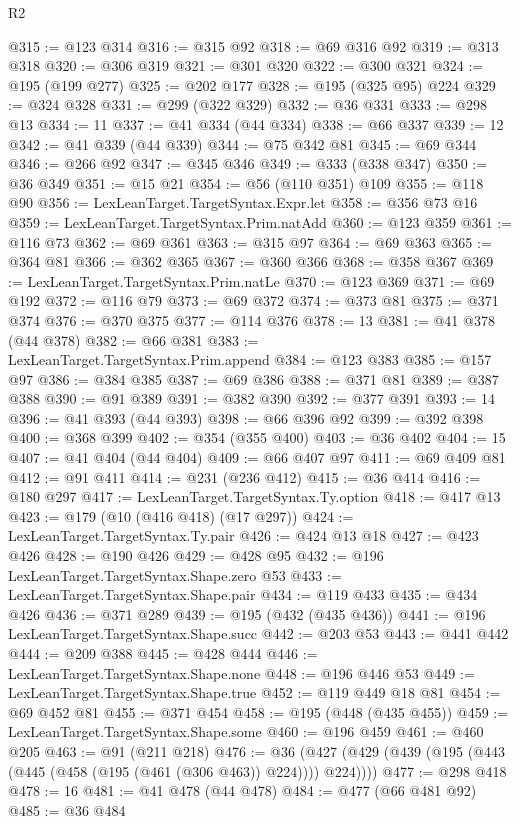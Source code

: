 \begin{lexlean}{R2}
\begin{coremodule}
{{{{{{{{{{{{{{{{{{{{{{{{{{{{{{{{{{{{{{{{{{{{{{@315 := @123 @314
@316 := @315 @92
@318 := @69 @316 @92
@319 := @313 @318
@320 := @306 @319
@321 := @301 @320
@322 := @300 @321
@324 := @195 (@199 @277)
@325 := @202 @177
@328 := @195 (@325 @95) @224
@329 := @324 @328
@331 := @299 (@322 @329)
@332 := @36 @331
@333 := @298 @13
@334 := 11
@337 := @41 @334 (@44 @334)
@338 := @66 @337
@339 := 12
@342 := @41 @339 (@44 @339)
@344 := @75 @342 @81
@345 := @69 @344
@346 := @266 @92
@347 := @345 @346
@349 := @333 (@338 @347)
@350 := @36 @349
@351 := @15 @21
@354 := @56 (@110 @351) @109
@355 := @118 @90
@356 := LexLeanTarget.TargetSyntax.Expr.let
@358 := @356 @73 @16
@359 := LexLeanTarget.TargetSyntax.Prim.natAdd
@360 := @123 @359
@361 := @116 @73
@362 := @69 @361
@363 := @315 @97
@364 := @69 @363
@365 := @364 @81
@366 := @362 @365
@367 := @360 @366
@368 := @358 @367
@369 := LexLeanTarget.TargetSyntax.Prim.natLe
@370 := @123 @369
@371 := @69 @192
@372 := @116 @79
@373 := @69 @372
@374 := @373 @81
@375 := @371 @374
@376 := @370 @375
@377 := @114 @376
@378 := 13
@381 := @41 @378 (@44 @378)
@382 := @66 @381
@383 := LexLeanTarget.TargetSyntax.Prim.append
@384 := @123 @383
@385 := @157 @97
@386 := @384 @385
@387 := @69 @386
@388 := @371 @81
@389 := @387 @388
@390 := @91 @389
@391 := @382 @390
@392 := @377 @391
@393 := 14
@396 := @41 @393 (@44 @393)
@398 := @66 @396 @92
@399 := @392 @398
@400 := @368 @399
@402 := @354 (@355 @400)
@403 := @36 @402
@404 := 15
@407 := @41 @404 (@44 @404)
@409 := @66 @407 @97
@411 := @69 @409 @81
@412 := @91 @411
@414 := @231 (@236 @412)
@415 := @36 @414
@416 := @180 @297
@417 := LexLeanTarget.TargetSyntax.Ty.option
@418 := @417 @13
@423 := @179 (@10 (@416 @418) (@17 @297))
@424 := LexLeanTarget.TargetSyntax.Ty.pair
@426 := @424 @13 @18
@427 := @423 @426
@428 := @190 @426
@429 := @428 @95
@432 := @196 LexLeanTarget.TargetSyntax.Shape.zero @53
@433 := LexLeanTarget.TargetSyntax.Shape.pair
@434 := @119 @433
@435 := @434 @426
@436 := @371 @289
@439 := @195 (@432 (@435 @436))
@441 := @196 LexLeanTarget.TargetSyntax.Shape.succ
@442 := @203 @53
@443 := @441 @442
@444 := @209 @388
@445 := @428 @444
@446 := LexLeanTarget.TargetSyntax.Shape.none
@448 := @196 @446 @53
@449 := LexLeanTarget.TargetSyntax.Shape.true
@452 := @119 @449 @18 @81
@454 := @69 @452 @81
@455 := @371 @454
@458 := @195 (@448 (@435 @455))
@459 := LexLeanTarget.TargetSyntax.Shape.some
@460 := @196 @459
@461 := @460 @205
@463 := @91 (@211 @218)
@476 := @36 (@427 (@429 (@439 (@195 (@443 (@445 (@458 (@195 (@461 (@306 @463)) @224)))) @224))))
@477 := @298 @418
@478 := 16
@481 := @41 @478 (@44 @478)
@484 := @477 (@66 @481 @92)
@485 := @36 @484
}}}}}}}}}}}}}}}}}}}}}}}}}}}}}}}}}}}}}}}}}}}}}}
\end{coremodule}
\end{lexlean}
